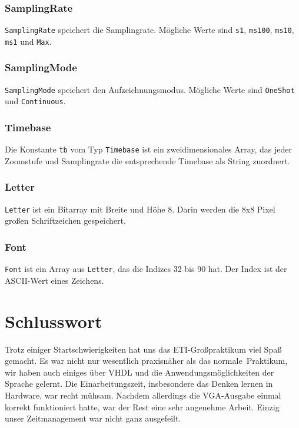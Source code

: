 \documentclass[IN,ngerman,utf8,12pt]{tumbook}
\begin{document}
\subsection{SamplingRate}
\label{kap:samplingrate}
\texttt{SamplingRate} speichert die Samplingrate.
Mögliche Werte sind \texttt{s1}, \texttt{ms100}, \texttt{ms10}, \texttt{ms1} und \texttt{Max}.

\subsection{SamplingMode}
\label{kap:samplingmode}
\texttt{SamplingMode} speichert den Aufzeichnungsmodus.
Mögliche Werte sind \texttt{OneShot} und \texttt{Continuous}.

\subsection{Timebase}
\label{kap:timebase}
Die Konstante \texttt{tb} vom Typ \texttt{Timebase} ist ein zweidimensionales Array, das jeder Zoomstufe und Samplingrate die entsprechende Timebase als String zuordnert.

\subsection{Letter}
\label{kap:letter}
\texttt{Letter} ist ein Bitarray mit Breite und Höhe 8.
Darin werden die 8x8 Pixel großen Schriftzeichen gespeichert.

\subsection{Font}
\label{kap:font}
\texttt{Font} ist ein Array aus \texttt{Letter}, das die Indizes 32 bis 90 hat.
Der Index ist der ASCII-Wert eines Zeichens.

\chapter{Schlusswort}
Trotz einiger Startschwierigkeiten hat uns das ETI-Großpraktikum viel Spaß gemacht. Es war nicht nur wesentlich praxisnäher als das \glqq normale\grqq\  Praktikum, wir haben auch einiges über VHDL und die Anwendungsmöglichkeiten der Sprache gelernt. Die Einarbeitungszeit, insbesondere das \glqq Denken lernen in Hardware\grqq, war recht mühsam. Nachdem allerdings die VGA-Ausgabe einmal korrekt funktioniert hatte, war der Rest eine sehr angenehme Arbeit. Einzig unser Zeitmanagement war nicht ganz ausgefeilt.
\end{document}
